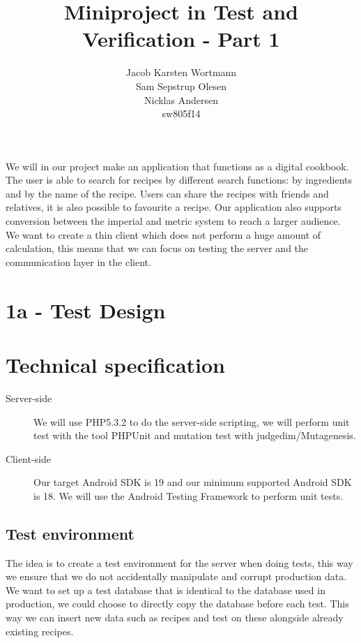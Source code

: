 \documentclass[a4paper,12pt]{memoir}
\title{Miniproject in Test and Verification - Part 1}
\author{Jacob Karsten Wortmann\\Sam Sepstrup Olesen\\Nicklas Andersen\\sw805f14}
\begin{document}
\maketitle %
We will in our project make an application that functions as a digital cookbook. The user is able to search for recipes by different search functions: by ingredients and by the name of the recipe. Users can share the recipes with friends and relatives, it is also possible to favourite a recipe. Our  application also supports conversion between the imperial and metric system to reach a larger audience. 
We want to create a thin client which does not perform a huge amount of calculation, this means that we can focus on testing the server and the communication layer in the client.

\section*{1a - Test Design}
\section*{Technical specification}
\begin{description}
    \item[Server-side]
        We will use PHP5.3.2 to do the server-side scripting,
        we will perform unit test with the tool PHPUnit and mutation test with judgedim/Mutagenesis.
    \item[Client-side]
        Our target Android SDK is 19 and our minimum supported Android SDK is 18. We will use the Android Testing Framework to perform unit tests.
\end{description}

\subsection{Test environment}
The idea is to create a test environment for the server when doing tests, this way we ensure that we do not accidentally manipulate and corrupt production data. We want to set up a test database that is identical to the database used in production, we could choose to directly copy the database before each test. This way we can insert new data such as recipes and test on these alongside already existing recipes.
\end{document}
